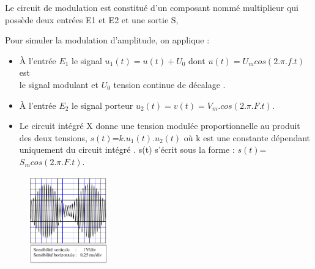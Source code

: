 \documentclass[12pt]{article}
\begin{document}
Le circuit de modulation est constitué d’un composant nommé multiplieur
qui possède deux entrées E1 et E2 et une sortie S,

Pour simuler la modulation d’amplitude, on applique :
\begin{itemize}

	\item À l’entrée $E_1$ le signal $u_1(t)=u(t)+U_0$ dont $u(t)=U_mcos(2.\pi.f.t)$ est\\ le
signal modulant et $U_0$ tension continue de décalage .
\item À l’entrée $E_2$ le signal porteur $u_2(t)=v(t)=V_m.cos(2.\pi.F.t)$.
\item Le circuit intégré X donne une tension modulée proportionnelle
au produit des deux tensions, $s(t)$=$ k.u_1(t).u_2(t)$ où k est une
constante dépendant uniquement du circuit intégré . s(t) s’écrit
sous la forme : $s(t)$=$S_mcos(2.\pi.F.t)$.
\end{itemize}

\begin{figure}
	\vspace{-3.5cm}

\begin{center}
  \includegraphics[width=0.3\textwidth]{./ex_034.png}
\end{center}
\end{figure}
\end{document}
